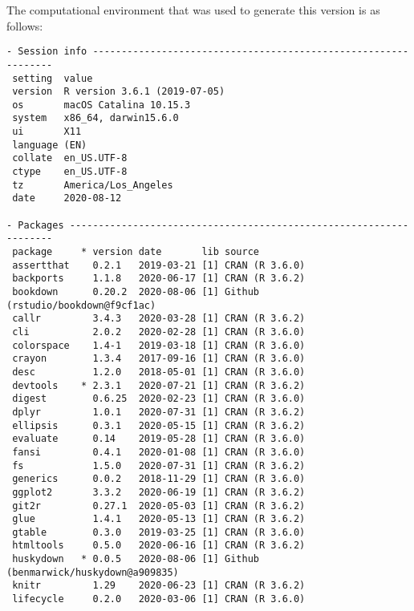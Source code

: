\documentclass [11pt, proquest] {uwthesis}[2015/03/03]
\begin{document}
The computational environment that was used to generate this version is
as follows:
\begin{verbatim}
- Session info ---------------------------------------------------------------
 setting  value                       
 version  R version 3.6.1 (2019-07-05)
 os       macOS Catalina 10.15.3      
 system   x86_64, darwin15.6.0        
 ui       X11                         
 language (EN)                        
 collate  en_US.UTF-8                 
 ctype    en_US.UTF-8                 
 tz       America/Los_Angeles         
 date     2020-08-12                  

- Packages -------------------------------------------------------------------
 package     * version date       lib source                               
 assertthat    0.2.1   2019-03-21 [1] CRAN (R 3.6.0)                       
 backports     1.1.8   2020-06-17 [1] CRAN (R 3.6.2)                       
 bookdown      0.20.2  2020-08-06 [1] Github (rstudio/bookdown@f9cf1ac)    
 callr         3.4.3   2020-03-28 [1] CRAN (R 3.6.2)                       
 cli           2.0.2   2020-02-28 [1] CRAN (R 3.6.0)                       
 colorspace    1.4-1   2019-03-18 [1] CRAN (R 3.6.0)                       
 crayon        1.3.4   2017-09-16 [1] CRAN (R 3.6.0)                       
 desc          1.2.0   2018-05-01 [1] CRAN (R 3.6.0)                       
 devtools    * 2.3.1   2020-07-21 [1] CRAN (R 3.6.2)                       
 digest        0.6.25  2020-02-23 [1] CRAN (R 3.6.0)                       
 dplyr         1.0.1   2020-07-31 [1] CRAN (R 3.6.2)                       
 ellipsis      0.3.1   2020-05-15 [1] CRAN (R 3.6.2)                       
 evaluate      0.14    2019-05-28 [1] CRAN (R 3.6.0)                       
 fansi         0.4.1   2020-01-08 [1] CRAN (R 3.6.0)                       
 fs            1.5.0   2020-07-31 [1] CRAN (R 3.6.2)                       
 generics      0.0.2   2018-11-29 [1] CRAN (R 3.6.0)                       
 ggplot2       3.3.2   2020-06-19 [1] CRAN (R 3.6.2)                       
 git2r         0.27.1  2020-05-03 [1] CRAN (R 3.6.2)                       
 glue          1.4.1   2020-05-13 [1] CRAN (R 3.6.2)                       
 gtable        0.3.0   2019-03-25 [1] CRAN (R 3.6.0)                       
 htmltools     0.5.0   2020-06-16 [1] CRAN (R 3.6.2)                       
 huskydown   * 0.0.5   2020-08-06 [1] Github (benmarwick/huskydown@a909835)
 knitr         1.29    2020-06-23 [1] CRAN (R 3.6.2)                       
 lifecycle     0.2.0   2020-03-06 [1] CRAN (R 3.6.0)                       

\end{verbatim}
\end{document}
